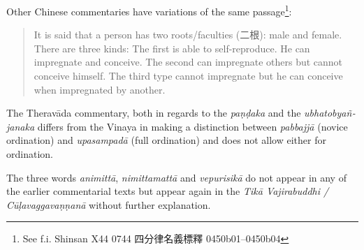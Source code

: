 Other Chinese commentaries have variations of the same passage\footnote{See f.i. Shinsan X44 0744 四分律名義標釋 0450b01–0450b04}:
\begin{quote}
It is said that a person has two roots/faculties (二根): male and female. There are three kinds: The first is able to self-reproduce. He can impregnate and conceive. The second can impregnate others but cannot conceive himself. The third type cannot impregnate but he can conceive when impregnated by another. 
\end{quote}

The Theravāda commentary, both in regards to the {\em paṇḍaka} and the {\em ubhatob­yañ­janaka} differs from the Vinaya in making a distinction between {\em pabbajjā} (novice ordination) and {\em upasampadā} (full ordination) and does not allow either for ordination.

The three words  {\em animittā}, {\em nimittamattā} and {\em vepurisikā} do not appear in any of the earlier commentarial texts but appear again in the {\em Tikā Vajirabuddhi / Cūḷavaggavaṇṇanā} without further explanation.
